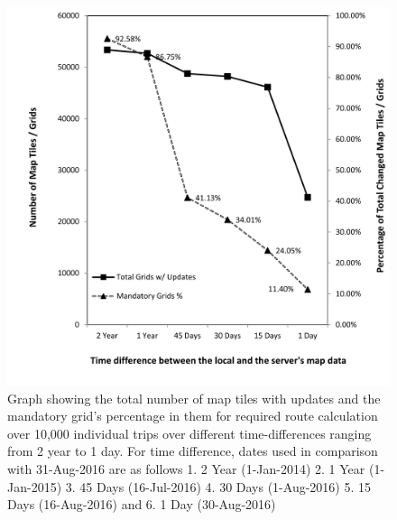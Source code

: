 \begin{figure}
\centering
\includegraphics[scale=.25]{dropinmandatory.png}
\caption{Graph showing the total number of map tiles with updates and the mandatory grid's percentage in them for required route calculation over 10,000 individual trips over different time-differences ranging from 2 year to 1 day. For time difference, dates used in comparison with 31-Aug-2016 are as follows 1. 2 Year (1-Jan-2014) 2. 1 Year (1-Jan-2015) 3. 45 Days (16-Jul-2016) 4. 30 Days (1-Aug-2016) 5. 15 Days (16-Aug-2016) and 6. 1 Day (30-Aug-2016)}
\label{fg:scenario1}
\end{figure}


